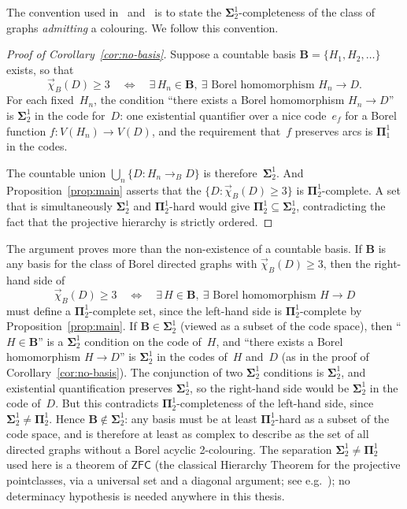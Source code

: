 \begin{remark}\label{rmk:sigma-pi-convention}
	The convention used in~\cite{Todorcevic_2021_ComplexProbBorel} and~\cite{thornton2022algebraic} is to state the $\mathbf\Sigma^1_2$-completeness of the class of graphs \emph{admitting} a colouring.
	We follow this convention.
\end{remark}

\begin{proof}[Proof of Corollary~\ref{cor:no-basis}]
Suppose a countable basis $\mathbf{B} = \{H_1,H_2,\dots\}$ exists, so that
$$
	\vec\chi_B(D) \geq 3
	\quad\Longleftrightarrow\quad
	\exists\, H_n\in\mathbf{B},\ \exists\text{ Borel homomorphism } H_n\to D.
$$
For each fixed~$H_n$, the condition ``there exists a Borel homomorphism $H_n\to D$'' is $\mathbf\Sigma^1_2$ in the code for~$D$: one existential quantifier over a nice code~$e_f$ for a Borel function $f\colon V(H_n)\to V(D)$, and the requirement that~$f$ preserves arcs is $\mathbf\Pi^1_1$ in the codes.

The countable union $\bigcup_n \{D : H_n\to_B D\}$ is therefore~$\mathbf\Sigma^1_2$.
And Proposition~\ref{prop:main} asserts that the $\{D : \vec\chi_B(D)\geq 3\}$ is $\mathbf\Pi^1_2$-complete.
A set that is simultaneously $\mathbf\Sigma^1_2$ and $\mathbf\Pi^1_2$-hard would give $\mathbf\Pi^1_2 \subseteq \mathbf\Sigma^1_2$, contradicting the fact that the projective hierarchy is strictly ordered.
\end{proof}

\begin{remark}\label{rmk:complexity-lower-bound}
	The argument proves more than the non-existence of a countable basis.
	If $\mathbf{B}$ is any basis for the class of Borel directed graphs with $\vec\chi_B(D)\geq 3$, then the right-hand side of
	$$
		\vec\chi_B(D)\geq 3 \quad\Longleftrightarrow\quad \exists\, H\in\mathbf{B},\ \exists\text{ Borel homomorphism }H\to D
	$$
	must define a $\mathbf\Pi^1_2$-complete set, since the left-hand side is $\mathbf\Pi^1_2$-complete by Proposition~\ref{prop:main}.
	If $\mathbf{B}\in\mathbf\Sigma^1_2$ (viewed as a subset of the code space), then ``$H\in\mathbf{B}$'' is a $\mathbf\Sigma^1_2$ condition on the code of~$H$, and ``there exists a Borel homomorphism $H\to D$'' is $\mathbf\Sigma^1_2$ in the codes of~$H$ and~$D$ (as in the proof of Corollary~\ref{cor:no-basis}).
	The conjunction of two $\mathbf\Sigma^1_2$ conditions is $\mathbf\Sigma^1_2$, and existential quantification preserves $\mathbf\Sigma^1_2$, so the right-hand side would be $\mathbf\Sigma^1_2$ in the code of~$D$.
	But this contradicts $\mathbf\Pi^1_2$-completeness of the left-hand side, since $\mathbf\Sigma^1_2\neq\mathbf\Pi^1_2$.
	Hence $\mathbf{B}\notin\mathbf\Sigma^1_2$: any basis must be at least $\mathbf\Pi^1_2$-hard as a subset of the code space, and is therefore at least as complex to describe as the set of all directed graphs without a Borel acyclic 2-colouring.
	The separation $\mathbf\Sigma^1_2\neq\mathbf\Pi^1_2$ used here is a theorem of $\mathsf{ZFC}$ (the classical Hierarchy Theorem for the projective pointclasses, via a universal set and a diagonal argument; see e.g.~\cite{Kechris_1995_DescriptiveSetTheory}); no determinacy hypothesis is needed anywhere in this thesis.
\end{remark}

